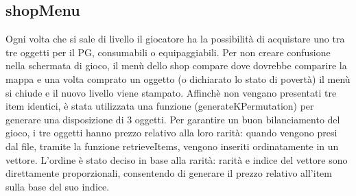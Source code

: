 \documentclass[12pt]{report}
\begin{document}
\subsection{shopMenu}

Ogni volta che si sale di livello il giocatore ha la possibilità di acquistare uno tra tre oggetti per 
il PG, consumabili o equipaggiabili. Per non creare confusione nella schermata di gioco, il menù dello shop compare dove dovrebbe comparire la mappa e una volta comprato un oggetto (o dichiarato lo stato di
povertà) il menù si chiude e il nuovo livello viene stampato. Affinchè non vengano presentati tre item
identici, è stata utilizzata una funzione (generateKPermutation) per generare una disposizione di 3
oggetti. Per garantire un buon bilanciamento del gioco, i tre oggetti hanno prezzo relativo alla loro
rarità: quando vengono presi dal file, tramite la funzione retrieveItems, vengono inseriti ordinatamente
in un vettore. L'ordine è stato deciso in base alla rarità: rarità e indice del vettore sono direttamente
proporzionali, consentendo di generare il prezzo relativo all'item sulla base del suo indice.
\end{document}
